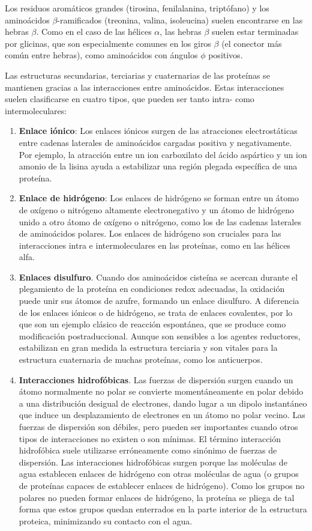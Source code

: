 Los residuos aromáticos grandes (tirosina, fenilalanina, triptófano) y los aminoácidos $\beta$-ramificados (treonina, valina, isoleucina) suelen encontrarse en las hebras $\beta$. Como en el caso de las hélices $\alpha$, las hebras $\beta$ suelen estar terminadas por glicinas, que son especialmente comunes en los giros $\beta$ (el conector más común entre hebras), como aminoácidos con ángulos $\phi$ positivos.

Las estructuras secundarias, terciarias y cuaternarias de las proteínas se mantienen gracias a las interacciones entre aminoácidos. Estas interacciones suelen clasificarse en cuatro tipos, que pueden ser tanto intra- como intermoleculares:
\begin{enumerate}
\item \textbf{Enlace iónico}: Los enlaces iónicos surgen de las atracciones electrostáticas entre cadenas laterales de aminoácidos cargadas positiva y negativamente. Por ejemplo, la atracción entre un ion carboxilato del ácido aspártico y un ion amonio de la lisina ayuda a estabilizar una región plegada específica de una proteína.
\item \textbf{Enlace de hidrógeno}: Los enlaces de hidrógeno se forman entre un átomo de oxígeno o nitrógeno altamente electronegativo y un átomo de hidrógeno unido a otro átomo de oxígeno o nitrógeno, como los de las cadenas laterales de aminoácidos polares. Los enlaces de hidrógeno son cruciales para las interacciones intra e intermoleculares en las proteínas, como en las hélices alfa.
\item \textbf{Enlaces disulfuro}. Cuando dos aminoácidos cisteína se acercan durante el plegamiento de la proteína en condiciones redox adecuadas, la oxidación puede unir sus átomos de azufre, formando un enlace disulfuro. A diferencia de los enlaces iónicos o de hidrógeno, se trata de enlaces covalentes, por lo que son un ejemplo clásico de reacción espontánea, que se produce como modificación postraduccional. Aunque son sensibles a los agentes reductores, estabilizan en gran medida la estructura terciaria y son vitales para la estructura cuaternaria de muchas proteínas, como los anticuerpos.
\item \textbf{Interacciones hidrofóbicas}. Las fuerzas de dispersión surgen cuando un átomo normalmente no polar se convierte momentáneamente en polar debido a una distribución desigual de electrones, dando lugar a un dipolo instantáneo que induce un desplazamiento de electrones en un átomo no polar vecino. Las fuerzas de dispersión son débiles, pero pueden ser importantes cuando otros tipos de interacciones no existen o son mínimas. El término interacción hidrofóbica suele utilizarse erróneamente como sinónimo de fuerzas de dispersión. Las interacciones hidrofóbicas surgen porque las moléculas de agua establecen enlaces de hidrógeno con otras moléculas de agua (o grupos de proteínas capaces de establecer enlaces de hidrógeno). Como los grupos no polares no pueden formar enlaces de hidrógeno, la proteína se pliega de tal forma que estos grupos quedan enterrados en la parte interior de la estructura proteica, minimizando su contacto con el agua.
\end{enumerate}

